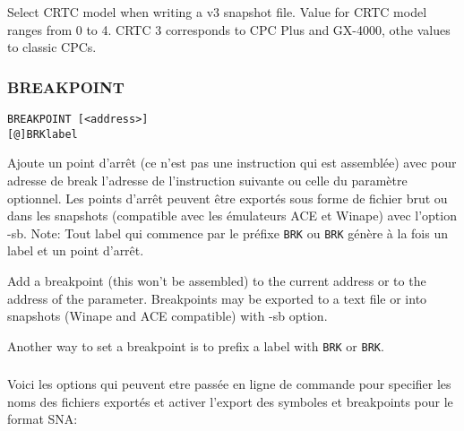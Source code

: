 \begin{xen}
Select CRTC model when writing a v3 snapshot file. Value for CRTC model ranges from 0 to 4. CRTC 3 corresponds to CPC Plus and GX-4000, othe values to classic CPCs.
\end{xen}


\subsubsection{BREAKPOINT}\label{BREAKPOINT}

\begin{verbatim}
BREAKPOINT [<address>]
[@]BRKlabel
\end{verbatim}

\begin{xfr}

Ajoute un point d'arrêt (ce n'est pas une instruction qui est assemblée) avec pour adresse de break l'adresse de l'instruction suivante ou celle du paramètre optionnel. Les points d'arrêt peuvent être exportés sous forme de fichier brut ou dans les snapshots (compatible avec les émulateurs ACE et Winape) avec l'option -sb.
Note: Tout label qui commence par le préfixe \texttt{BRK} ou \texttt{\at BRK} génère à la fois un label et un point d'arrêt.
\end{xfr}

\begin{xen}
Add a breakpoint (this won't be assembled) to the current address or to the address of the parameter. Breakpoints may be exported to a text file or into snapshots (Winape and ACE compatible) with -sb option.

Another way to set a breakpoint is to prefix a label with \texttt{BRK} or \texttt{\at BRK}.
\end{xen}

\subsubsection{}    \label{options_export_cpc}
\begin{xfr}
Voici les options qui peuvent etre passée en ligne de commande pour specifier les noms des fichiers exportés et activer l'export des symboles et breakpoints pour le format SNA:
\end{xfr}


